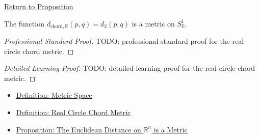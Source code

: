 \newpage
{}
\label{prf:real-circle-chord-metric}

\begin{remark*}[Return]
\hyperref[prop:real-circle-chord-metric]{Return to Proposition}
\end{remark*}

\begin{proposition*}
The function \(d_{\mathrm{chord},\mathbb{R}}(p,q)=d_2(p,q)\) is a metric on
\(S^1_{\mathbb{R}}\).
\end{proposition*}

\begin{proof}[Professional Standard Proof]
\LRAProofBodyStart
TODO: professional standard proof for the real circle chord metric.
\end{proof}

\begin{proof}[Detailed Learning Proof]
\LRAProofBodyStart
TODO: detailed learning proof for the real circle chord metric.
\end{proof}

\begin{remark*}
\end{remark*}

\begin{dependencies}
\begin{itemize}
  \item \hyperref[def:metric-space]{Definition: Metric Space}
  \item \hyperref[def:real-circle-chord-metric]{Definition: Real Circle Chord Metric}
  \item \hyperref[prop:euclidean-distance-rn-metric]{Proposition: The Euclidean Distance on \(\mathbb{R}^n\) is a Metric}
\end{itemize}
\end{dependencies}

\clearpage

